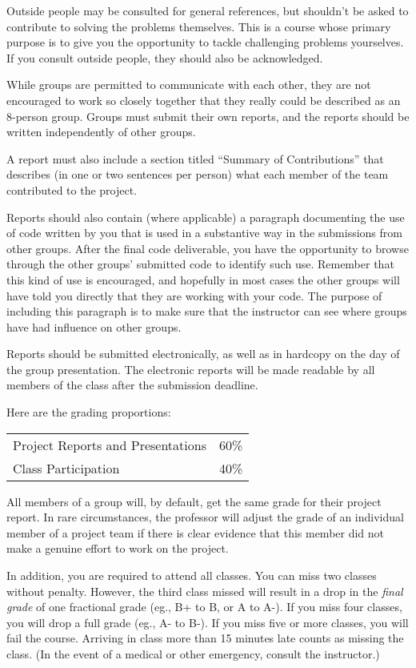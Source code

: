Outside people may be consulted for general references, but shouldn't
be asked to contribute to solving the problems themselves.  This is a
course whose primary purpose is to give you the opportunity to
tackle challenging problems yourselves.
If you consult outside people, they should
also be acknowledged.

While groups are permitted to communicate with each other, they are
not encouraged to work so closely together that they really could be
described as an 8-person group.  Groups must submit their own reports,
and the reports should be written independently of other groups.

A report must also include a section titled ``Summary of
Contributions'' that describes (in one or two sentences per person)
what each member of the team contributed to the project.

Reports should also contain (where applicable) a paragraph documenting
the use of code written by you that is used in a substantive way in
the submissions from other groups.  After the final code deliverable,
you have the opportunity to browse through the other groups' submitted
code to identify such use.  Remember that this kind of use is
encouraged, and hopefully in most cases the other groups will have
told you directly that they are working with your code.  The purpose
of including this paragraph is to make sure that the instructor can
see where groups have had influence on other groups.

Reports should be submitted electronically, as well as in hardcopy on the
day of the group presentation.  The electronic reports will be made
readable by all members of the class after the submission deadline.

Here are the grading proportions:

\begin{tabular}{ll}
Project Reports and Presentations & 60\% \\
Class Participation & 40\%
\end{tabular}

All members of a group will, by default, get the same grade for their
project report.  In rare circumstances, the professor will adjust the
grade of an individual member of a project team if there is clear
evidence that this member did not make a genuine effort to work on
the project.

In addition, you are required to attend all classes.  You can miss
two classes without penalty.  However, the third class missed will
result in a drop in the {\em final grade} of one fractional grade
(eg., B+ to B, or A to A-).  If you miss four classes, you will
drop a full grade (eg., A- to B-).  If you miss five or more
classes, you will fail the course.  Arriving in class more than
15 minutes late counts as missing the class.  (In the event of
a medical or other emergency, consult the instructor.)


